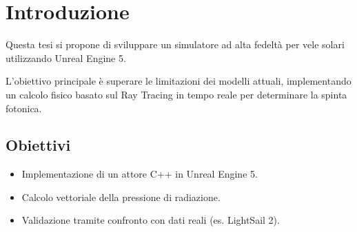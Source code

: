\chapter{Introduzione}
\label{chap:intro}

Questa tesi si propone di sviluppare un simulatore ad alta fedeltà per vele solari utilizzando Unreal Engine 5.

L'obiettivo principale è superare le limitazioni dei modelli attuali, implementando un calcolo fisico basato sul Ray Tracing in tempo reale per determinare la spinta fotonica.

\section{Obiettivi}
\begin{itemize}
    \item Implementazione di un attore C++ in Unreal Engine 5.
    \item Calcolo vettoriale della pressione di radiazione.
    \item Validazione tramite confronto con dati reali (es. LightSail 2).
\end{itemize}

\cite{mcinnes1999solar}
\cite{ericson2004real}
\cite{johnson2012status}
\cite{simo2016realistic}
\cite{spencer2023lightsail2}
\cite{mcconnell2023solarcruiser}
\cite{rodrigues2023review}
